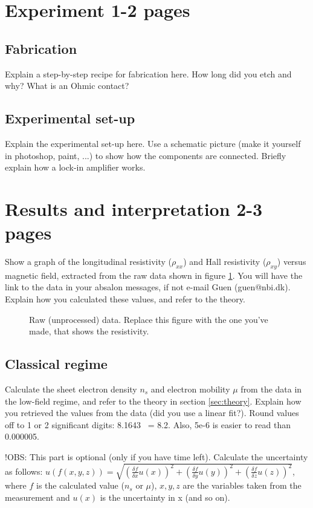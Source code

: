 \documentclass[a4paper]{article}
\begin{document}
      \section{Experiment 1-2 pages}
      \subsection{Fabrication}
      Explain a step-by-step recipe for fabrication here. How long did you etch and why? What is an Ohmic contact?
      \subsection{Experimental set-up}
      Explain the experimental set-up here. Use a schematic picture (make it yourself in photoshop, paint, ...) to show how the components are connected. Briefly explain how a lock-in amplifier works.
      
      \section{Results and interpretation 2-3 pages}
      Show a graph of the longitudinal resistivity ($\rho_{xx}$) and Hall resistivity ($\rho_{xy}$) versus magnetic field, extracted from the raw data shown in figure \ref{fig:data}. You will have the link to the data in your absalon messages, if not e-mail Guen (guen@nbi.dk). Explain how you calculated these values, and refer to the theory.
      
      \begin{figure}
      \centering
      \caption{\label{fig:data}Raw (unprocessed) data. Replace this figure with the one you've made, that shows the resistivity.}
      \end{figure}
      
      \subsection{Classical regime}
      Calculate the sheet electron density $n_{s}$ and electron mobility $\mu$ from the data in the low-field regime, and refer to the theory in section \ref{sec:theory}. Explain how you retrieved the values from the data (did you use a linear fit?).
      Round values off to 1 or 2 significant digits: 8.1643 ~= 8.2. Also, 5e-6 is easier to read than 0.000005.
      
      !OBS: This part is optional (only if you have time left).
      Calculate the uncertainty as follows: \newline $u(f(x, y, z)) = \sqrt{(\frac{\delta f}{\delta{x}} u(x))^{2} + (\frac{\delta f}{\delta{y}} u(y))^{2} + (\frac{\delta f}{\delta{z}} u(z))^{2}}$, where $f$ is the calculated value ($n_{s}$ or $\mu$), $x, y, z$ are the variables taken from the measurement and $u(x)$ is the uncertainty in x (and so on).
      
\end{document}
